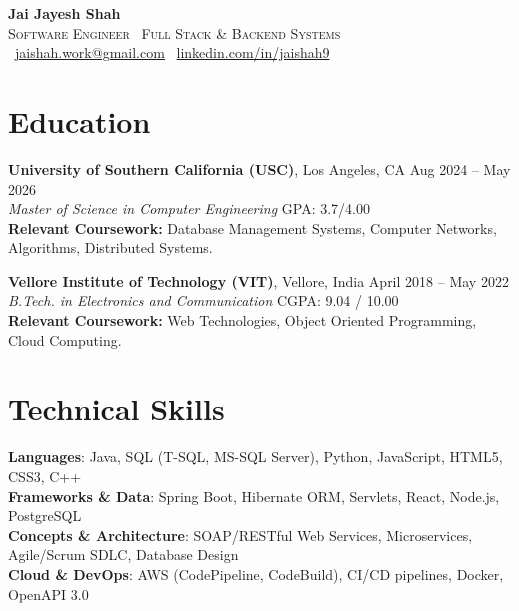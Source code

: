 \documentclass[letterpaper,11pt]{article}
\begin{document}
\begin{center}
    {\LARGE \textbf{Jai Jayesh Shah}}\\
    {\normalsize\scshape Software Engineer \textbar\ Full Stack \& Backend Systems}\\
    \small
    \faEnvelope\ \href{mailto:jaishah.work@gmail.com}{jaishah.work@gmail.com}
    \quad
    \faLinkedin\ \href{https://www.linkedin.com/in/jaishah9}{linkedin.com/in/jaishah9}
\end{center}
\vspace{-13pt}


\section*{Education}
\textbf{University of Southern California (USC)}, Los Angeles, CA \hfill Aug 2024 -- May 2026 \\
\textit{Master of Science in Computer Engineering} \hfill GPA: 3.7/4.00 \\
\textbf{Relevant Coursework:} Database Management Systems, Computer Networks, Algorithms, Distributed Systems.

\vspace{3pt}
\textbf{Vellore Institute of Technology (VIT)}, Vellore, India \hfill April 2018 -- May 2022 \\
\textit{B.Tech. in Electronics and Communication} \hfill CGPA: 9.04 / 10.00 \\
\textbf{Relevant Coursework:} Web Technologies, Object Oriented Programming, Cloud Computing.

\section*{Technical Skills}
\begin{itemize}[leftmargin=0.15in, label={}]
    {\item{
     \textbf{Languages}{: Java, SQL (T-SQL, MS-SQL Server), Python, JavaScript, HTML5, CSS3, C++} \\
     \textbf{Frameworks \& Data}{: Spring Boot, Hibernate ORM, Servlets, React, Node.js, PostgreSQL} \\
     \textbf{Concepts \& Architecture}{: SOAP/RESTful Web Services, Microservices, Agile/Scrum SDLC, Database Design} \\
     \textbf{Cloud \& DevOps}{: AWS (CodePipeline, CodeBuild), CI/CD pipelines, Docker, OpenAPI 3.0}
    }}
\end{itemize}
\end{document}
